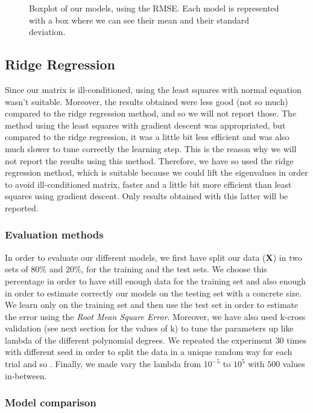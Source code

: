 \documentclass{article} %
\begin{document}
\begin{figure}[!t]
\caption{Boxplot of our models, using the RMSE. Each model is represented with a box where we can see their mean and their standard deviation.}
\caption{}
\end{figure}

\subsection{Ridge Regression}

Since our matrix is ill-conditioned, using the least squares with normal equation wasn't suitable. Moreover, the results obtained were less good (not so much) compared to the ridge regression method, and so we will not report those. The method using the least squares with gradient descent was appropriated, but compared to the ridge regression, it was a little bit less efficient and was also much slower to tune correctly the learning step. This is the reason why we will not report the results using this method. Therefore, we have so used the ridge regression method, which is suitable because we could lift the eigenvalues in order to avoid ill-conditioned matrix, faster and a little bit more efficient than least squares using gradient descent. Only results obtained with this latter will be reported.

\subsubsection{Evaluation methods}

In order to evaluate our different models, we first have split our data ($\mathbf{X}$) in two sets of $80\%$ and $20\%$, for the training and the test sets. We choose this percentage in order to have still enough data for the training set and also enough in order to estimate correctly our models on the testing set with a concrete size. We learn only on the training set and then use the test set in order to estimate the error using the \textit{Root Mean Square Error}. Moreover, we have also used k-cross validation (see next section for the values of k) to tune the parameters up like lambda of the different polynomial degrees. We repeated the experiment $30$ times with different seed in order to split the data in a unique random way for each trial and so . Finally, we made vary the lambda from $10^{-5}$ to $10^{5}$ with $500$ values in-between.

\subsubsection{Model comparison}
\end{document}
